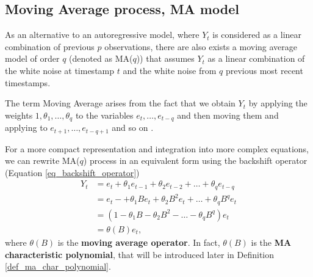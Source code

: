 \subsection{Moving Average process, MA model}

As an alternative to an autoregressive model, where $Y_t$ is considered as a linear combination of previous $p$ observations, there are also exists a moving average model of order $q$ (denoted as MA($q$)) that assumes $Y_t$ as a linear combination of the white noise at timestamp $t$ and the white noise from $q$ previous most recent timestamps. 


The term Moving Average arises from the fact that we obtain $Y_t$ by applying the weights $1, \theta_1, \ldots, \theta_q$ to the variables $e_t, \ldots, e_{t-q}$ and then moving them and applying to $e_{t+1}, \ldots, e_{t-q+1}$ and so on \cite{cryer2008time}. 

For a more compact representation and integration into more complex equations, we can rewrite MA($q$) process in an equivalent form using the backshift operator (Equation \ref{eq_backshift_operator}) \begin{equation}
\begin{aligned}
    Y_t &= e_t + \theta_{1}e_{t-1} + \theta_{2}e_{t-2} + \ldots + \theta_{q}e_{t-q}\\
        &= e_t - + \theta_{1}Be_t + \theta_{2}B^{2}e_t + \ldots + \theta_{q}B^{q}e_t\\
        &= (1 - \theta_{1}B - \theta_{2}B^2 - \ldots - \theta_{q}B^q)e_t \\
        &= \theta(B)e_t,
    \label{eq_ma_operator}
\end{aligned}
\end{equation}
where $\theta(B)$ is the \textbf{moving average operator}. In fact, $\theta(B)$ is the \textbf{MA characteristic polynomial}, that will be introduced later in Definition \ref{def_ma_char_polynomial}.

